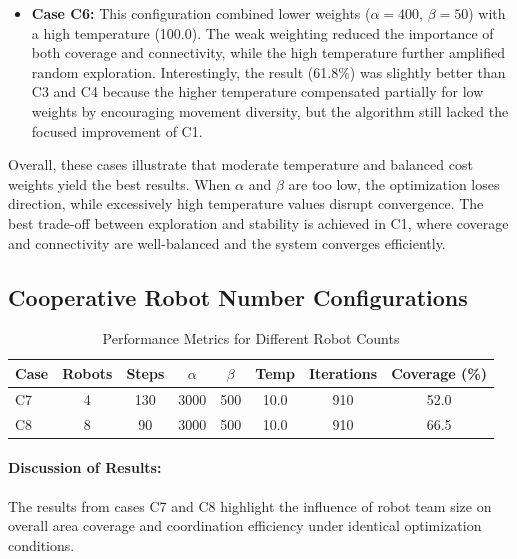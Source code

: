 \begin{itemize}
    \item \textbf{Case C6:} 
    This configuration combined lower weights ($\alpha=400$, $\beta=50$) with a high temperature (100.0). 
    The weak weighting reduced the importance of both coverage and connectivity, while the high temperature further amplified random exploration. 
    Interestingly, the result (61.8\%) was slightly better than C3 and C4 because the higher temperature compensated partially for low weights by encouraging movement diversity, but the algorithm still lacked the focused improvement of C1.
\end{itemize}

Overall, these cases illustrate that moderate temperature and balanced cost weights yield the best results. 
When $\alpha$ and $\beta$ are too low, the optimization loses direction, while excessively high temperature values disrupt convergence. 
The best trade-off between exploration and stability is achieved in C1, where coverage and connectivity are well-balanced and the system converges efficiently.

\subsection{Cooperative Robot Number Configurations}

\begin{table}[H]
\centering
\caption{Performance Metrics for Different Robot Counts}
\begin{tabular}{@{}lccccccc@{}}
\toprule
\textbf{Case} & \textbf{Robots} & \textbf{Steps} & \textbf{$\alpha$} & \textbf{$\beta$} & \textbf{Temp} & \textbf{Iterations} & \textbf{Coverage (\%)} \\
\midrule
C7 & 4 & 130 & 3000 & 500 & 10.0 & 910 & 52.0 \\
C8 & 8 & 90 & 3000 & 500 & 10.0 & 910 & 66.5 \\
\bottomrule
\end{tabular}
\label{tab:sa_robots}
\end{table}

\paragraph{Discussion of Results:}
The results from cases C7 and C8 highlight the influence of robot team size on overall area coverage and coordination efficiency under identical optimization conditions.

